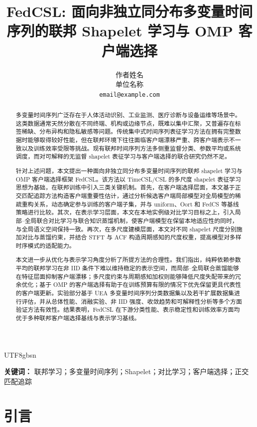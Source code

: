 \documentclass{article}
\title{FedCSL: 面向非独立同分布多变量时间序列的联邦 Shapelet 学习与 OMP 客户端选择}
\author{%
  作者姓名 \\
  单位名称 \\
  \texttt{email@example.com}
}
\begin{document}
\begin{CJK*}{UTF8}{gbsn}

\maketitle

\renewcommand{\abstractname}{摘要}

\begin{abstract}
多变量时间序列广泛存在于人体活动识别、工业监测、医疗诊断与设备运维等场景中。这类数据通常天然分散在不同终端、机构或边缘节点，既难以集中汇聚，又普遍存在标签稀缺、分布异构和隐私敏感等问题。传统集中式时间序列表征学习方法在拥有完整数据时能够取得较好性能，但在联邦环境下往往面临客户端漂移严重、跨客户端表示不一致以及训练效率受限等挑战。现有联邦时间序列方法多侧重监督分类、参数平均或系统调度，而对可解释的无监督 shapelet 表征学习与客户端选择的联合研究仍然不足。

针对上述问题，本文提出一种面向非独立同分布多变量时间序列的联邦 shapelet 学习与 OMP 客户端选择框架 FedCSL。该方法以 TimeCSL/CSL 的多尺度 shapelet 表征学习思想为基础，在联邦训练中引入三类关键机制。首先，在客户端选择层面，本文基于正交匹配追踪方法构造客户端重要性估计，通过分析候选客户端局部模型对全局模型的稀疏重构关系，动态确定参与训练的客户端子集，并与 uniform、Oort 和 FedCS 等基线策略进行比较。其次，在表示学习层面，本文在本地实例级对比学习目标之上，引入局部--全局联合对比学习与联合知识蒸馏机制，使客户端模型在保留本地适应性的同时，与全局语义空间保持一致。再次，在多尺度建模层面，本文对不同 shapelet 尺度分别施加对比与蒸馏约束，并结合 STFT 与 ACF 构造周期感知的尺度权重，提高模型对多样时序模式的适配能力。

本文进一步从优化与表示学习角度分析了所提方法的合理性。我们指出，纯粹依赖参数平均的联邦学习在非 IID 条件下难以维持稳定的表示空间，而局部--全局联合蒸馏能够在特征层面抑制客户端漂移；多尺度约束与周期感知加权则能够降低尺度失配带来的冗余优化；基于 OMP 的客户端选择有助于在训练预算有限的情况下优先保留更具代表性的客户端更新。实验部分基于 UEA 多变量时间序列分类数据集以及若干扩展数据集进行评估，并从总体性能、消融实验、非 IID 强度、收敛趋势和可解释性分析等多个方面验证方法有效性。结果表明，FedCSL 在下游分类性能、表示稳定性和训练效率方面均优于多种联邦客户端选择基线与表示学习基线。
\end{abstract}

\noindent\textbf{关键词：} 联邦学习；多变量时间序列；Shapelet；对比学习；客户端选择；正交匹配追踪

\section{引言}


\end{CJK*}
\end{document}
